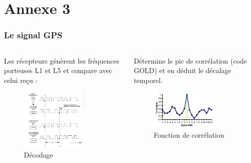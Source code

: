 \documentclass[xcolor=dvipsnames,envcountsect]{beamer}
\begin{document}
\section{Annexe 3}
\begin{frame}
	\label{appendix:3}
	\frametitle{Le signal GPS}
	\begin{columns}
		\begin{column}{0.5\textwidth}
			Les récepteurs génèrent les fréquences porteuses L1 et L5 et compare avec celui reçu :
			\begin{figure}
				\centering
				\includegraphics[width=0.8\textwidth]{./Figures/correl1.png}
				\caption {Décodage \cite{ens}}
			\end{figure}
		\end{column}
		\begin{column}{0.5\textwidth}
			Détermine le pic de corrélation (code GOLD) et en déduit le décalage temporel.
			\begin{figure}
				\centering
				\includegraphics[width=0.8\textwidth]{./Figures/correl2.png}
				\caption {Fonction de corrélation \cite{ens}}
			\end{figure}
		\end{column}
	\end{columns}
\end{frame}
\end{document}
